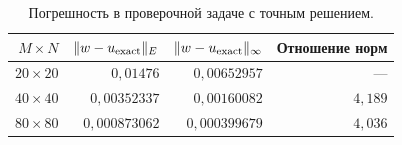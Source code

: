 \begin{table}[H]
\centering\small
\caption{Погрешность в проверочной задаче с точным решением.}
\begin{tabular}{rrrr}
\toprule
$M\times N$ & $\|w-u_{\rm exact}\|_E$ & $\|w-u_{\rm exact}\|_\infty$ & Отношение норм \\
\midrule
$20\times20$ & $0{,}01476$ & $0{,}00652957$ & --- \\
$40\times40$ & $0{,}00352337$ & $0{,}00160082$ & $4{,}189$ \\
$80\times80$ & $0{,}000873062$ & $0{,}000399679$ & $4{,}036$ \\
\bottomrule
\end{tabular}
\end{table}

